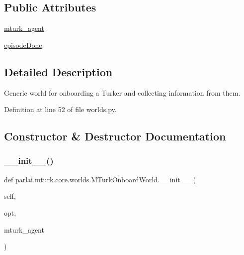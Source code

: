 \subsection*{Public Attributes}
\begin{DoxyCompactItemize}
\item 
\hyperlink{classparlai_1_1mturk_1_1core_1_1worlds_1_1MTurkOnboardWorld_a38d19c84f42e452f782df53df4fb9861}{mturk\+\_\+agent}
\item 
\hyperlink{classparlai_1_1mturk_1_1core_1_1worlds_1_1MTurkOnboardWorld_a025e27063d46523f471e2ac600592019}{episode\+Done}
\end{DoxyCompactItemize}


\subsection{Detailed Description}
\begin{DoxyVerb}Generic world for onboarding a Turker and collecting
information from them.\end{DoxyVerb}
 

Definition at line 52 of file worlds.\+py.



\subsection{Constructor \& Destructor Documentation}
\mbox{\label{classparlai_1_1mturk_1_1core_1_1worlds_1_1MTurkOnboardWorld_a6e38dd34f2894a74aa3d3d004e5be41f}} 
\subsubsection{\texorpdfstring{\+\_\+\+\_\+init\+\_\+\+\_\+()}{\_\_init\_\_()}}
{\footnotesize\ttfamily def parlai.\+mturk.\+core.\+worlds.\+M\+Turk\+Onboard\+World.\+\_\+\+\_\+init\+\_\+\+\_\+ (\begin{DoxyParamCaption}\item[{}]{self,  }\item[{}]{opt,  }\item[{}]{mturk\+\_\+agent }\end{DoxyParamCaption})}

